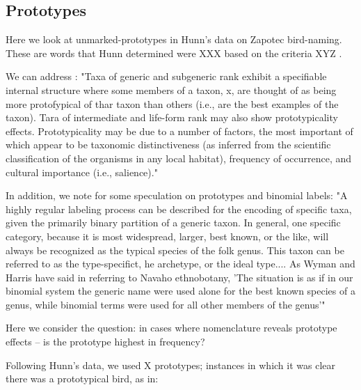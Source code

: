 \documentclass[10pt,letterpaper]{article}
\begin{document}
\subsection{Prototypes}

Here we look at unmarked-prototypes in Hunn's data on Zapotec bird-naming. These are words that Hunn determined were XXX based on the criteria XYZ \cite{hunn2008zapotec}.


We can address \cite{berlin2014ethnobiological}:
 "Taxa of generic and subgeneric rank exhibit a specifiable internal
structure where some members of a taxon, x, are thought of as being
more protofypical of thar taxon than others (i.e., are the best
examples of the taxon). Tara of intermediate and life-form rank may
also show prototypicality effects. Prototypicality may be due to a
number of factors, the most important of which appear to be taxonomic
distinctiveness (as inferred from the scientific classification of the
organisms in any local habitat), frequency of occurrence, and cultural
importance (i.e., salience)."

In addition, we note \cite{berlin1972speculations} for some speculation on prototypes and binomial labels:
"A highly regular labeling process can be described for the encoding of
specific taxa, given the primarily binary partition of a generic taxon. In
general, one specific category, because it is most widespread, larger, best
known, or the like, will always be recognized as the typical species of the
folk genus. This taxon can be referred to as the type-specifict, he archetype,
or the ideal type....
As Wyman and Harris have said in referring to Navaho ethnobotany, 'The
situation is as if in our binomial system the generic name were used alone for
the best known species of a genus, while binomial terms were used for all other
 members of the genus'"

Here we consider the question: in cases where nomenclature reveals prototype effects -- is the prototype highest in frequency?

Following Hunn's data\cite{hunn2008zapotec}, we used X prototypes; instances in which it was clear there was a prototypical bird, as in: 


\end{document}
